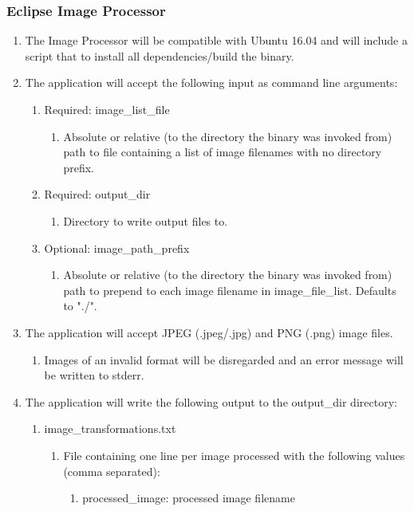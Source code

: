 \documentclass[10pt, onecolumn, draftclsnofoot, letterpaper, compsoc]{IEEEtran}
\begin{document}
\subsubsection{Eclipse Image Processor}
	\begin{enumerate}
		\item The Image Processor will be compatible with Ubuntu 16.04 and
		 will include a script that to install all dependencies/build the
		 binary.

		 \item The application will accept the following input as command line
		 arguments:
		 \begin{enumerate}
		 	\item Required: image\_list\_file
		 		\begin{enumerate}
		 			\item Absolute or relative (to the directory the binary was
		 			invoked from) path to file containing a list of image filenames
		 			with no directory prefix.
		 		\end{enumerate}

		 	\item Required: output\_dir
		 		\begin{enumerate}
		 			\item Directory to write output files to.
		 		\end{enumerate}

		 	\item Optional: image\_path\_prefix
		 		\begin{enumerate}
		 			\item Absolute or relative (to the directory the binary was
		 			 invoked from) path to prepend to each image filename in
		 			 image\_file\_list. Defaults to "./".
		 		\end{enumerate}
		 \end{enumerate}

		 \item The application will accept JPEG (.jpeg/.jpg) and PNG (.png)
		 image files.
		 \begin{enumerate}
		 	\item Images of an invalid format will be disregarded and an error
		 	 message will be written to stderr.
		 \end{enumerate}

		 \item The application will write the following output to the
		 output\_dir directory:
		 \begin{enumerate}
		 	\item image\_transformations.txt
		 	\begin{enumerate}
		 		\item File containing one line per image processed with the
		 		following values (comma separated):
		 		\begin{enumerate}
		 			\item processed\_image: processed image filename


\end{enumerate}
\end{enumerate}
\end{enumerate}
\end{enumerate}
\end{document}
